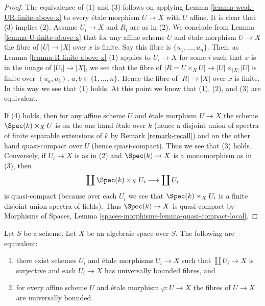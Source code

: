 \begin{proof}
The equivalence of (1) and (3) follows on applying
Lemma \ref{lemma-weak-UR-finite-above-x}
to every \'etale morphism $U \to X$ with $U$ affine.
It is clear that (3) implies (2).
Assume $U_i \to X$ and $R_i$ are as in (2). We conclude from
Lemma \ref{lemma-U-finite-above-x}
that for any affine scheme $U$ and \'etale morphism $U \to X$
the fibre of $|U| \to |X|$ over $x$ is finite.
Say this fibre is $\{u_1, \ldots, u_n\}$. Then, as
Lemma \ref{lemma-R-finite-above-x} (1)
applies to $U_i \to X$ for some $i$ such that $x$ is in the image of
$|U_i| \to |X|$, we see that the fibre of
$|R = U \times_X U| \to |U| \times_{|X|} |U|$
is finite over $(u_a, u_b)$, $a, b \in \{1, \ldots, n\}$.
Hence the fibre of $|R| \to |X|$ over $x$ is finite.
In this way we see that (1) holds. At this point we know that
(1), (2), and (3) are equivalent.

\medskip\noindent
If (4) holds, then for any affine scheme $U$ and \'etale morphism
$U \to X$ the scheme $\Spec(k) \times_X U$ is on the one hand
\'etale over $k$ (hence a disjoint union of spectra of finite separable
extensions of $k$ by
Remark \ref{remark-recall})
and on the other hand quasi-compact over $U$ (hence quasi-compact).
Thus we see that (3) holds.
Conversely, if $U_i \to X$ is as in (2) and $\Spec(k) \to X$
is a monomorphism as in (3), then
$$
\coprod \Spec(k) \times_X U_i
\longrightarrow
\coprod U_i
$$
is quasi-compact (because over each $U_i$ we see that
$\Spec(k) \times_X U_i$ is a finite disjoint union spectra of fields).
Thus $\Spec(k) \to X$ is quasi-compact by
Morphisms of Spaces, Lemma \ref{spaces-morphisms-lemma-quasi-compact-local}.
\end{proof}

\begin{lemma}
\label{lemma-U-universally-bounded}
Let $S$ be a scheme. Let $X$ be an algebraic space over $S$.
The following are equivalent:
\begin{enumerate}
\item there exist schemes $U_i$ and \'etale morphisms
$U_i \to X$ such that $\coprod U_i \to X$ is surjective and
each $U_i \to X$ has universally bounded fibres, and
\item for every affine scheme $U$ and \'etale morphism $\varphi : U \to X$
the fibres of $U \to X$ are universally bounded.
\end{enumerate}
\end{lemma}

